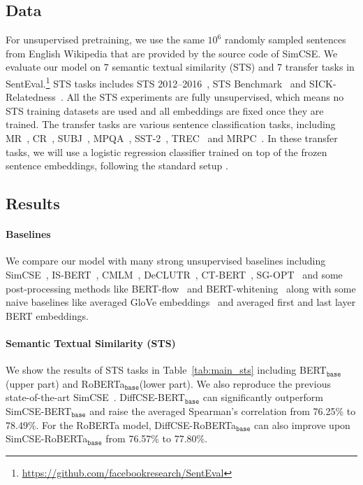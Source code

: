 \documentclass[11pt]{article}
\newcommand{\diffcse}{DiffCSE\xspace}
\newcommand{\ba}{$_\texttt{base}$\xspace}
\begin{document}
\subsection{Data}
For unsupervised pretraining, we use the same $10^6$ randomly sampled sentences from English Wikipedia that are provided by the source code of SimCSE.
We evaluate our model on 7 semantic textual similarity (STS) and 7 transfer tasks in SentEval.\footnote{\scriptsize\url{https://github.com/facebookresearch/SentEval}} STS tasks includes STS 2012--2016~\cite{agirre-etal-2016-semeval},
STS Benchmark~\cite{cer-etal-2017-semeval} and
SICK-Relatedness~\cite{marelli2014sick}.
All the STS experiments are fully unsupervised, which means no STS training datasets are used and all embeddings are fixed once they are trained. 
The transfer tasks are various sentence classification tasks, including MR~\cite{pang2005seeing}, CR~\cite{hu2004mining}, SUBJ~\cite{pang2004sentimental}, MPQA~\cite{wiebe2005annotating}, SST-2~\cite{socher2013recursive}, TREC~\cite{voorhees2000building} and MRPC~\cite{dolan2005automatically}.
In these transfer tasks, we will use a logistic regression classifier trained on top of the frozen sentence embeddings, following the standard setup \cite{conneau-kiela-2018-senteval}.


\subsection{Results}

\paragraph{Baselines} We compare our model with many strong unsupervised baselines including SimCSE~\cite{gao2021simcse}, IS-BERT~\cite{zhang2020unsupervised}, CMLM~\cite{yang2020universal}, DeCLUTR~\cite{giorgi2020declutr}, CT-BERT~\cite{carlsson2021semantic}, SG-OPT~\cite{kim2021self} and some post-processing methods like BERT-flow~\cite{li-etal-2020-sentence} and BERT-whitening~\cite{su2021whitening} along with some naive baselines like averaged GloVe embeddings~\cite{pennington2014glove} and averaged first and last layer BERT embeddings.

\paragraph{Semantic Textual Similarity (STS)}
We show the results of STS tasks in Table~\ref{tab:main_sts} including BERT\ba (upper part) and RoBERTa\ba (lower part). We also reproduce the previous state-of-the-art SimCSE~\cite{gao2021simcse}. \diffcse-BERT\ba can significantly outperform SimCSE-BERT\ba and raise the averaged Spearman’s correlation from 76.25\% to 78.49\%. 
For the RoBERTa model, \diffcse-RoBERTa\ba can also improve upon SimCSE-RoBERTa\ba from 76.57\% to 77.80\%.
\end{document}
